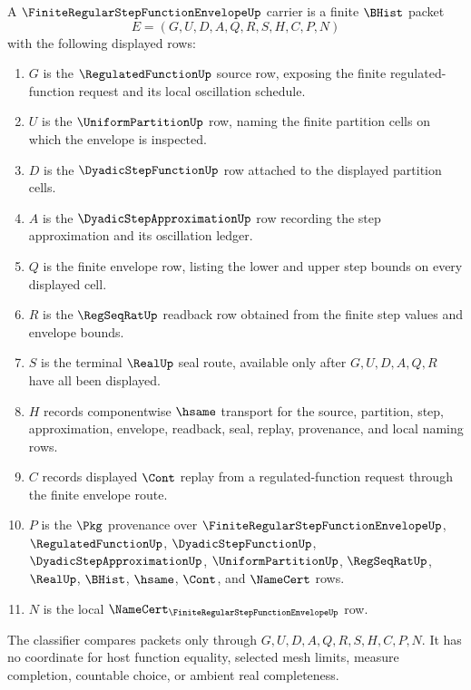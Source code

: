 \begin{definition}
\label{def:finite-regular-step-function-envelope-carrier}
A $\FiniteRegularStepFunctionEnvelopeUp$ carrier is a finite $\BHist$ packet
$$
E=(G,U,D,A,Q,R,S,H,C,P,N)
$$
with the following displayed rows:
\begin{enumerate}
\item $G$ is the $\RegulatedFunctionUp$ source row, exposing the finite regulated-function request and its local oscillation schedule.
\item $U$ is the $\UniformPartitionUp$ row, naming the finite partition cells on which the envelope is inspected.
\item $D$ is the $\DyadicStepFunctionUp$ row attached to the displayed partition cells.
\item $A$ is the $\DyadicStepApproximationUp$ row recording the step approximation and its oscillation ledger.
\item $Q$ is the finite envelope row, listing the lower and upper step bounds on every displayed cell.
\item $R$ is the $\RegSeqRatUp$ readback row obtained from the finite step values and envelope bounds.
\item $S$ is the terminal $\RealUp$ seal route, available only after $G,U,D,A,Q,R$ have all been displayed.
\item $H$ records componentwise $\hsame$ transport for the source, partition, step, approximation, envelope, readback, seal, replay, provenance, and local naming rows.
\item $C$ records displayed $\Cont$ replay from a regulated-function request through the finite envelope route.
\item $P$ is the $\Pkg$ provenance over $\FiniteRegularStepFunctionEnvelopeUp$, $\RegulatedFunctionUp$, $\DyadicStepFunctionUp$, $\DyadicStepApproximationUp$, $\UniformPartitionUp$, $\RegSeqRatUp$, $\RealUp$, $\BHist$, $\hsame$, $\Cont$, and $\NameCert$ rows.
\item $N$ is the local $\NameCert_{\FiniteRegularStepFunctionEnvelopeUp}$ row.
\end{enumerate}
The classifier compares packets only through $G,U,D,A,Q,R,S,H,C,P,N$. It has no coordinate for host function equality, selected mesh limits, measure completion, countable choice, or ambient real completeness.
\end{definition}

